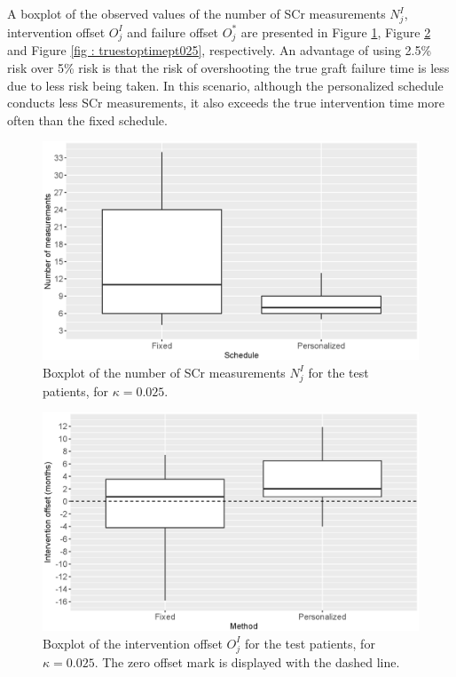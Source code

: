 A boxplot of the observed values of the number of SCr measurements $N^I_j$, intervention offset $O^I_j$ and failure offset $O^*_j$ are presented in Figure \ref{fig : nObspt025}, Figure \ref{fig : truethrestimept025} and Figure \ref{fig : truestoptimept025}, respectively. An advantage of using 2.5\% risk over 5\% risk is that the risk of overshooting the true graft failure time is less due to less risk being taken. In this scenario, although the personalized schedule conducts less SCr measurements, it also exceeds the true intervention time more often than the fixed schedule.

\begin{figure}[!htb]
\centerline{\includegraphics[width=\columnwidth]{images/nObspt025.eps}}
\caption{Boxplot of the number of SCr measurements $N^I_j$ for the test patients, for $\kappa = 0.025$.}
\label{fig : nObspt025}
\end{figure}

\begin{figure}[!htb]
\centerline{\includegraphics[width=\columnwidth]{images/truethrestimept025.eps}}
\caption{Boxplot of the intervention offset $O^I_j$ for the test patients, for $\kappa = 0.025$. The zero offset mark is displayed with the dashed line.}
\label{fig : truethrestimept025}
\end{figure}

